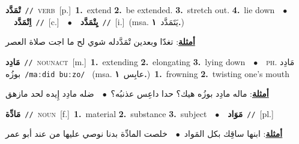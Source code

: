 \documentclass[10pt,a4paper,twoside]{article} %
\begin{document}
\begin{multicols}{2}
{\setlength\topsep{0pt}\textbf{\foreignlanguage{arabic}{تْمَدَّد}}\ {\color{gray}\texttt{//}\color{black}}\ \textsc{verb}\ [p.]\ \textbf{1.}~extend  \textbf{2.}~be extended.  \textbf{3.}~stretch out.  \textbf{4.}~lie down\ \ $\bullet$\ \ \setlength\topsep{0pt}\textbf{\foreignlanguage{arabic}{اِتْمَدَّد}}\ {\color{gray}\texttt{//}\color{black}}\ [c.]\ \ $\bullet$\ \ \setlength\topsep{0pt}\textbf{\foreignlanguage{arabic}{يِتْمَدَّد}}\ {\color{gray}\texttt{//}\color{black}}\ [i.]\ \color{gray}(msa. \foreignlanguage{arabic}{يَتَمَدَّد}~\foreignlanguage{arabic}{\textbf{١.}})\color{black}\  \begin{flushright}\color{gray}\foreignlanguage{arabic}{\textbf{\underline{\foreignlanguage{arabic}{أمثلة}}}: تغدّا وبعدين تْمَدَّدله شوي لح ما اجت صلاة العصر}\end{flushright}\color{black}} \vspace{2mm}

{\setlength\topsep{0pt}\textbf{\foreignlanguage{arabic}{مَادِد}}\ {\color{gray}\texttt{//}\color{black}}\ \textsc{noun\textunderscore act}\ [m.]\ \textbf{1.}~extending  \textbf{2.}~elongating  \textbf{3.}~lying down\ \ $\bullet$\ \ \textsc{ph.} \color{gray} \foreignlanguage{arabic}{مَادِد بوزُه}\color{black}\ {\color{gray}\texttt{/{\sffamily maːdid buːzo}/}\color{black}}\ \color{gray} (msa. \foreignlanguage{arabic}{عابِس}~\foreignlanguage{arabic}{\textbf{١.}})\color{black}\ \textbf{1.}~frowning  \textbf{2.}~twisting one's mouth\  \begin{flushright}\color{gray}\foreignlanguage{arabic}{\textbf{\underline{\foreignlanguage{arabic}{أمثلة}}}: ماله مادِد بوزُه هيك؟ حدا داعِس عذنبُه؟\ $\bullet$\ \  ضله مادِد إِيده لحد مازهق}\end{flushright}\color{black}} \vspace{2mm}

{\setlength\topsep{0pt}\textbf{\foreignlanguage{arabic}{مَادِّة}}\ {\color{gray}\texttt{//}\color{black}}\ \textsc{noun}\ [f.]\ \textbf{1.}~material  \textbf{2.}~substance  \textbf{3.}~subject\ \ $\bullet$\ \ \setlength\topsep{0pt}\textbf{\foreignlanguage{arabic}{مَوَاد}}\ {\color{gray}\texttt{//}\color{black}}\ [pl.]\  \begin{flushright}\color{gray}\foreignlanguage{arabic}{\textbf{\underline{\foreignlanguage{arabic}{أمثلة}}}: ابنها ساقِك بكل المَواد\ $\bullet$\ \  خلصت المادِّة بدنا نوصي عليها من عند أبو عمر}\end{flushright}\color{black}} \vspace{2mm}


\end{multicols}
\end{document}

